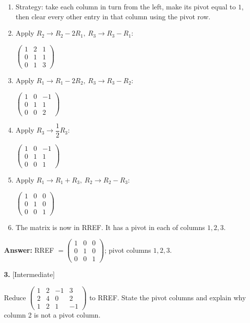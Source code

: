 \documentclass[11pt]{article}
\begin{document}
\begin{tcolorbox}[breakable,colback=ans,colframe=ansb,boxrule=0.5pt,left=4pt,right=4pt,top=2pt,bottom=2pt]\begin{enumerate}[leftmargin=2.2em,itemsep=1pt,topsep=1pt,label=\textbf{Step \arabic*.}]\item Strategy: take each column in turn from the left, make its pivot equal to $1$, then clear every other entry in that column using the pivot row.
\item Apply $R_2\to R_2-2R_1,\ R_3\to R_3-R_1$:\par\smallskip $\displaystyle \begin{pmatrix}1 & 2 & 1 \\ 0 & 1 & 1 \\ 0 & 1 & 3\end{pmatrix}$
\item Apply $R_1\to R_1-2R_2,\ R_3\to R_3-R_2$:\par\smallskip $\displaystyle \begin{pmatrix}1 & 0 & -1 \\ 0 & 1 & 1 \\ 0 & 0 & 2\end{pmatrix}$
\item Apply $R_3\to \dfrac{1}{2} R_3$:\par\smallskip $\displaystyle \begin{pmatrix}1 & 0 & -1 \\ 0 & 1 & 1 \\ 0 & 0 & 1\end{pmatrix}$
\item Apply $R_1\to R_1+R_3,\ R_2\to R_2-R_3$:\par\smallskip $\displaystyle \begin{pmatrix}1 & 0 & 0 \\ 0 & 1 & 0 \\ 0 & 0 & 1\end{pmatrix}$
\item The matrix is now in RREF. It has a pivot in each of columns $1,2,3$.
\end{enumerate}\textbf{Answer:} RREF $=\begin{pmatrix}1 & 0 & 0 \\ 0 & 1 & 0 \\ 0 & 0 & 1\end{pmatrix}$; pivot columns $1,2,3$.\end{tcolorbox}
\par\vspace{2pt}
\begin{minipage}{\linewidth}\textbf{3.} \hfill{\scriptsize\color{ink}[Intermediate]}\par\nopagebreak Reduce $\begin{pmatrix}1 & 2 & -1 & 3 \\ 2 & 4 & 0 & 2 \\ 1 & 2 & 1 & -1\end{pmatrix}$ to RREF. State the pivot columns and explain why column 2 is not a pivot column.
\end{minipage}\par\nopagebreak
\end{document}

